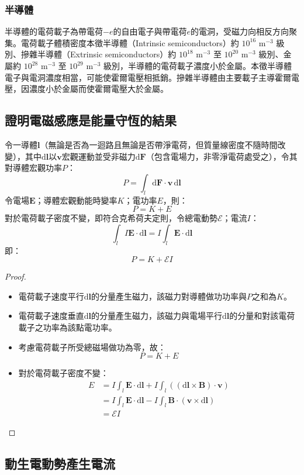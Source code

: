 \documentclass[a4paper,12pt]{report}
\begin{document}
\begin{itemize}
\subsubsection{半導體}
半導體的電荷載子為帶電荷$-e$的自由電子與帶電荷$e$的電洞，受磁力向相反方向聚集。電荷載子體積密度本徵半導體（Intrinsic semiconductors）約 $10^{16}$ m$^{-3}$ 級別、摻雜半導體（Extrinsic semiconductors）約 $10^{18}$ m$^{-3}$ 至 $10^{20}$ m$^{-3}$ 級別、金屬約 $10^{28}$ m$^{-3}$ 至 $10^{29}$ m$^{-3}$ 級別，半導體的電荷載子濃度小於金屬。本徵半導體電子與電洞濃度相當，可能使霍爾電壓相抵銷。摻雜半導體由主要載子主導霍爾電壓，因濃度小於金屬而使霍爾電壓大於金屬。
\subsection{證明電磁感應是能量守恆的結果}
令一導體$\mathbf{l}$（無論是否為一迴路且無論是否帶淨電荷，但質量線密度不隨時間改變），其中$\mathrm{d}\mathbf{l}$以$\mathbf{v}$宏觀運動並受非磁力$\mathrm{d}\mathbf{F}$（包含電場力，非零淨電荷處受之），令其對導體宏觀功率$P$：
\[P=\int_l\mathrm{d}\mathbf{F}\cdot\mathbf{v}\,\mathrm{d}\mathbf{l}\]
令電場$\mathbf{E}$；導體宏觀動能時變率$K$；電功率$E$，則：
\[P=K+E\]
對於電荷載子密度不變，即符合克希荷夫定則，令總電動勢$\mathcal{E}$；電流$I$：
\[\int_lI\mathbf{E}\cdot\mathrm{d}\mathbf{l}=I\int_l\mathbf{E}\cdot\mathrm{d}\mathbf{l}\]
即：
\[P=K+\mathcal{E}I\]
\begin{proof}\mbox{}\\
\begin{itemize}
\item 電荷載子速度平行$\mathrm{d}\mathbf{l}$的分量產生磁力，該磁力對導體做功功率與$P$之和為$K$。
\item 電荷載子速度垂直$\mathrm{d}\mathbf{l}$的分量產生磁力，該磁力與電場平行$\mathrm{d}\mathbf{l}$的分量和對該電荷載子之功率為該點電功率。
\item 考慮電荷載子所受總磁場做功為零，故：
\[P=K+E\]
\item 對於電荷載子密度不變：
\[\begin{aligned}
E&=I\int_l\mathbf{E}\cdot\mathrm{d}\mathbf{l}+I\int_l((\mathrm{d}\mathbf{l}\times\mathbf{B})\cdot\mathbf{v})\\
&=I\int_l\mathbf{E}\cdot\mathrm{d}\mathbf{l}-I\int_l\mathbf{B}\cdot(\mathbf{v}\times\mathrm{d}\mathbf{l})\\
&=\mathcal{E}I
\end{aligned}\]
\end{itemize}
\end{proof}
\subsection{動生電動勢產生電流}

\end{itemize}
\end{document}
